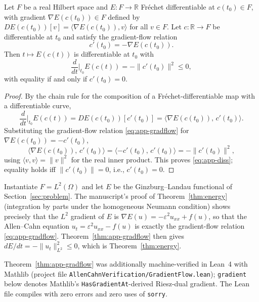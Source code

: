 \documentclass[symmetry,article,submit,moreauthors]{Definitions/mdpi}
\begin{document}
\begin{Theorem}\label{thm:app-gradflow}
Let $F$ be a real Hilbert space and $E:F\to\mathbb{R}$ Fr\'echet differentiable at $c(t_0)\in F$, with gradient $\nabla E(c(t_0))\in F$ defined by $DE(c(t_0))[v]=\langle\nabla E(c(t_0)),v\rangle$ for all $v\in F$. Let $c:\mathbb{R}\to F$ be differentiable at $t_0$ and satisfy the gradient-flow relation
\begin{equation}\label{eq:app-gradflow}
c'(t_0) = -\nabla E(c(t_0)).
\end{equation}
Then $t\mapsto E(c(t))$ is differentiable at $t_0$ with
\begin{equation}\label{eq:app-diss}
\frac{d}{dt}\bigg|_{t_0} E(c(t)) = -\|c'(t_0)\|^2 \le 0,
\end{equation}
with equality if and only if $c'(t_0)=0$.
\end{Theorem}
\begin{proof}
By the chain rule for the composition of a Fr\'echet-differentiable map with a differentiable curve,
\[
\frac{d}{dt}\bigg|_{t_0} E(c(t)) = DE(c(t_0))[c'(t_0)] = \langle \nabla E(c(t_0)),\,c'(t_0)\rangle.
\]
Substituting the gradient-flow relation \eqref{eq:app-gradflow} for $\nabla E(c(t_0))=-c'(t_0)$,
\[
\langle \nabla E(c(t_0)),\,c'(t_0)\rangle = \langle -c'(t_0),\,c'(t_0)\rangle = -\|c'(t_0)\|^2,
\]
using $\langle v,v\rangle=\|v\|^2$ for the real inner product. This proves \eqref{eq:app-diss}; equality holds iff $\|c'(t_0)\|=0$, i.e., $c'(t_0)=0$.
\end{proof}

\begin{Corollary}
Instantiate $F=L^2(\Omega)$ and let $E$ be the Ginzburg--Landau functional of Section~\ref{sec:problem}. The manuscript's proof of Theorem~\ref{thm:energy} (integration by parts under the homogeneous Neumann condition) shows precisely that the $L^2$ gradient of $E$ is $\nabla E(u)=-\varepsilon^2u_{xx}+f(u)$, so that the Allen--Cahn equation $u_t=\varepsilon^2u_{xx}-f(u)$ is exactly the gradient-flow relation \eqref{eq:app-gradflow}. Theorem~\ref{thm:app-gradflow} then gives $dE/dt=-\|u_t\|^2_{L^2}\le0$, which is Theorem~\ref{thm:energy}.
\end{Corollary}

Theorem~\ref{thm:app-gradflow} was additionally machine-verified in Lean~4 with Mathlib (project file \texttt{AllenCahnVerification/GradientFlow.lean}); \texttt{gradient} below denotes Mathlib's \texttt{HasGradientAt}-derived Riesz-dual gradient. The Lean file compiles with zero errors and zero uses of \texttt{sorry}.
\end{document}
